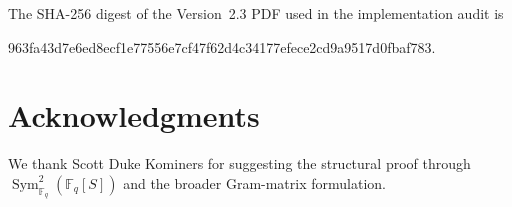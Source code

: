 \documentclass[runningheads]{llncs}
\newcommand{\F}{\mathbb F}
\begin{document}
The SHA-256 digest of the Version~2.3 PDF used in the implementation audit is
\begin{center}
\ttfamily\small 963fa43d7e6ed8ecf1e77556e7cf47f62d4c34177efece2cd9a9517d0fbaf783.
\end{center}

\ifdefined\ANONYMOUS
\else
\section*{Acknowledgments}
We thank Scott Duke Kominers for suggesting the structural proof through
$\operatorname{Sym}^2_{\F_q}(\F_q[S])$ and the broader Gram-matrix formulation.
\fi

\printbibliography
\end{document}
